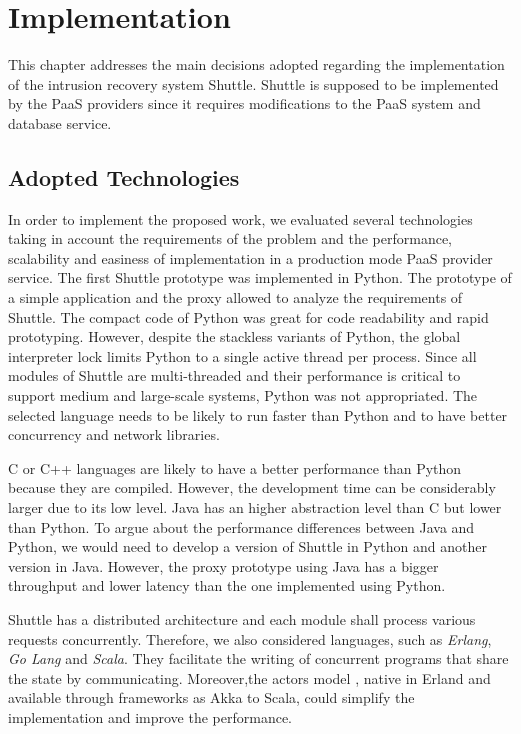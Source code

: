 \chapter{Implementation}\label{chapter:implementation}
This chapter addresses the main decisions adopted regarding the implementation of the intrusion recovery system Shuttle. Shuttle is supposed to be implemented by the \acf{PaaS} providers since it requires modifications to the \ac{PaaS} system and database service.

\section{Adopted Technologies}\label{sec:impl:adopted_technologies}
In order to implement the proposed work, we evaluated several technologies taking in account the requirements of the problem and the performance, scalability and easiness of implementation in a production mode \acf{PaaS} provider service.
The first Shuttle prototype was implemented in Python. The prototype of a simple application and the proxy allowed to analyze the requirements of Shuttle. The compact code of Python was great for code readability and rapid prototyping. However, despite the stackless variants of Python, the global interpreter lock limits Python to a single active thread per process. Since all modules of Shuttle are multi-threaded and their performance is critical to support medium and large-scale systems, Python was not appropriated. The selected language needs to be likely to run faster than Python and to have better concurrency and network libraries.

C or C++ languages are likely to have a better performance than Python because they are compiled. However, the development time can be considerably larger due to its low level. 
Java has an higher abstraction level than C but lower than Python. To argue about the performance differences between Java and Python, we would need to develop a version of Shuttle in Python and another version in Java. However, the proxy prototype using Java has a bigger throughput and lower latency than the one implemented using Python. 

Shuttle has a distributed architecture and each module shall process various requests concurrently. Therefore, we also considered languages, such as \emph{Erlang}, \emph{Go Lang} and \emph{Scala}. They facilitate the writing of concurrent programs that share the state by communicating. Moreover,the actors model \cite{actors}, native in Erland and available through frameworks as Akka \cite{akka} to Scala, could simplify the implementation and improve the performance. 

